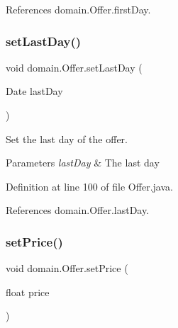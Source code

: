 References domain.\+Offer.\+first\+Day.

\mbox{\label{classdomain_1_1Offer_a52363278771059c51820160889c2bed1}} 
\subsubsection{\texorpdfstring{setLastDay()}{setLastDay()}}
{\footnotesize\ttfamily void domain.\+Offer.\+set\+Last\+Day (\begin{DoxyParamCaption}\item[{Date}]{last\+Day }\end{DoxyParamCaption})}



Set the last day of the offer. 


\begin{DoxyParams}{Parameters}
{\em last\+Day} & The last day \\
\hline
\end{DoxyParams}


Definition at line 100 of file Offer.\+java.


\begin{DoxyCode}{0}

\end{DoxyCode}


References domain.\+Offer.\+last\+Day.

\mbox{\label{classdomain_1_1Offer_a8bd526902732e030571b6889c5507f4c}} 
\subsubsection{\texorpdfstring{setPrice()}{setPrice()}}
{\footnotesize\ttfamily void domain.\+Offer.\+set\+Price (\begin{DoxyParamCaption}\item[{float}]{price }\end{DoxyParamCaption})}



